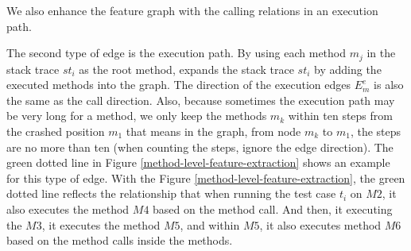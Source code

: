 
We also enhance the feature graph with the calling relations in an
execution path. 

The second type of edge is the execution path. By using each method $m_j$ in the stack trace $st_i$ as the root method, \tool expands the stack trace $st_i$ by adding the executed methods into the graph. The direction of the execution edges $E_m^e$ is also the same as the call direction. Also, because sometimes the execution path may be very long for a method, we only keep the methods $m_k$ within ten steps from the crashed position $m_1$ that means in the graph, from node $m_k$ to $m_1$, the steps are no more than ten (when counting the steps, \tool ignore the edge direction). The green dotted line in Figure \ref{method-level-feature-extraction} shows an example for this type of edge. With the Figure \ref{method-level-feature-extraction}, the green dotted line reflects the relationship that when running the test case $t_i$ on $M2$, it also executes the method $M4$ based on the method call. And then, it executing the $M3$, it executes the method $M5$, and within $M5$, it also executes method $M6$ based on the method calls inside the methods.

